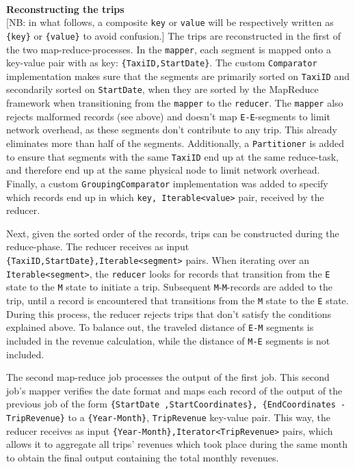 \documentclass[11pt]{article}
\begin{document}

\noindent\\\textbf{Reconstructing the trips} \\
{[NB: in what follows, a composite \texttt{key} or \texttt{value} will be respectively written as \texttt{\{key\}} or \texttt{\{value\}} to avoid confusion.]}
\noindent The trips are reconstructed in the first of the two map-reduce-processes. In the \texttt{mapper}, each segment is mapped onto a key-value pair with as key: \texttt{\{TaxiID,StartDate\}}. The custom \texttt{Comparator} implementation makes sure that the segments are primarily sorted on \texttt{TaxiID} and secondarily sorted on \texttt{StartDate}, when they are sorted by the MapReduce framework when transitioning from the \texttt{mapper} to the \texttt{reducer}. The \texttt{mapper} also rejects malformed records (see above) and doesn't map \texttt{E-E}-segments to limit network overhead, as these segments don't contribute to any trip. This already eliminates more than half of the segments. Additionally, a \texttt{Partitioner} is added to ensure that segments with the same \texttt{TaxiID} end up at the same reduce-task, and therefore end up at the same physical node to limit network overhead. Finally, a custom \texttt{GroupingComparator} implementation was added to specify which records end up in which \texttt{key, Iterable<value>} pair, received by the reducer.

Next, given the sorted order of the records, trips can be constructed during the reduce-phase. The reducer receives as input \texttt{\{TaxiID,StartDate\},Iterable<segment>} pairs. When iterating over an \texttt{Iterable<segment>}, the \texttt{reducer} looks for records that transition from the \texttt{E} state to the \texttt{M} state to initiate a trip. Subsequent \texttt{M}-\texttt{M}-records are added to the trip, until a record is encountered that transitions from the \texttt{M} state to the \texttt{E} state. During this process, the reducer rejects trips that don't satisfy the conditions explained above. To balance out, the traveled distance of \texttt{E-M} segments is included in the revenue calculation, while the distance of \texttt{M-E} segments is not included.

The second map-reduce job processes the output of the first job. This second job's mapper verifies the date format and maps each record of the output of the previous job of the form \texttt{\{StartDate ,StartCoordinates\}, \{EndCoordinates - TripRevenue\}} to a \texttt{\{Year-Month\}}, \texttt{TripRevenue} key-value pair. This way, the reducer receives as input \texttt{\{Year-Month\},Iterator<TripRevenue>} pairs, which allows it to aggregate all trips' revenues which took place during the same month to obtain the final output containing the total monthly revenues.
\end{document}

